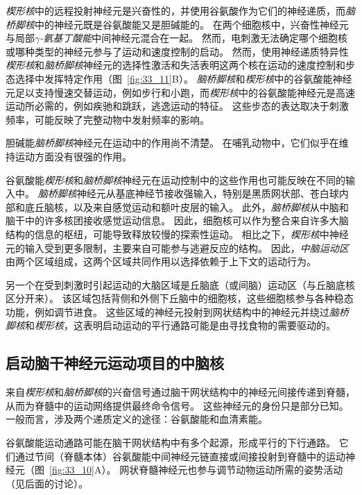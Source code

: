 \textit{楔形核}中的远程投射神经元是兴奋性的，并使用谷氨酸作为它们的神经递质，而\textit{脑桥脚核}中的神经元既是谷氨酸能又是胆碱能的。
在两个细胞核中，兴奋性神经元与局部\textit{$\gamma$-氨基丁酸能}中间神经元混合在一起。
然而，电刺激无法确定哪个细胞核或哪种类型的神经元参与了运动和速度控制的启动。
然而，使用神经递质特异性\textit{楔形核}和\textit{脑桥脚核}神经元的选择性激活和失活表明这两个核在运动的速度控制和步态选择中发挥特定作用（图~\ref{fig:33_11}B）。
\textit{脑桥脚核}和\textit{楔形核}中的谷氨酸能神经元足以支持慢速交替运动，例如步行和小跑，而\textit{楔形核}中的谷氨酸能神经元是高速运动所必需的，例如疾驰和跳跃，逃逸运动的特征。
这些步态的表达取决于刺激频率，可能反映了完整动物中发射频率的影响。


胆碱能\textit{脑桥脚核}神经元在运动中的作用尚不清楚。
在哺乳动物中，它们似乎在维持运动方面没有很强的作用。


谷氨酸能\textit{楔形核}和\textit{脑桥脚核}神经元在运动控制中的这些作用也可能反映在不同的输入中。
\textit{脑桥脚核}神经元从基底神经节接收强输入，特别是黑质网状部、苍白球内部和底丘脑核，以及来自感觉运动和额叶皮层的输入。
此外，\textit{脑桥脚核}从中脑和脑干中的许多核团接收感觉运动信息。
因此，细胞核可以作为整合来自许多大脑结构的信息的枢纽，可能导致释放较慢的探索性运动。
相比之下，\textit{楔形核}中神经元的输入受到更多限制，主要来自可能参与逃避反应的结构。
因此，\textit{中脑运动区}由两个区域组成，这两个区域共同作用以选择依赖于上下文的运动行为。


另一个在受到刺激时引起运动的大脑区域是丘脑底（或间脑）运动区（与丘脑底核区分开来）。
该区域包括背侧和外侧下丘脑中的细胞核，这些细胞核参与各种稳态功能，例如调节进食。
这些区域的神经元投射到网状结构中的神经元并绕过\textit{脑桥脚核}和\textit{楔形核}，这表明启动运动的平行通路可能是由寻找食物的需要驱动的。



\subsection{启动脑干神经元运动项目的中脑核}

来自\textit{楔形核}和\textit{脑桥脚核}的兴奋信号通过脑干网状结构中的神经元间接传递到脊髓，从而为脊髓中的运动网络提供最终命令信号。
这些神经元的身份只是部分已知。
一般而言，涉及两个递质定义的途径：谷氨酸能和血清素能。


谷氨酸能运动通路可能在脑干网状结构中有多个起源，形成平行的下行通路。
它们通过节间（脊髓本体）谷氨酸能中间神经元链直接或间接投射到脊髓中的运动神经元（图~\ref{fig:33_10}A）。
网状脊髓神经元也参与调节动物运动所需的姿势活动（见后面的讨论）。


